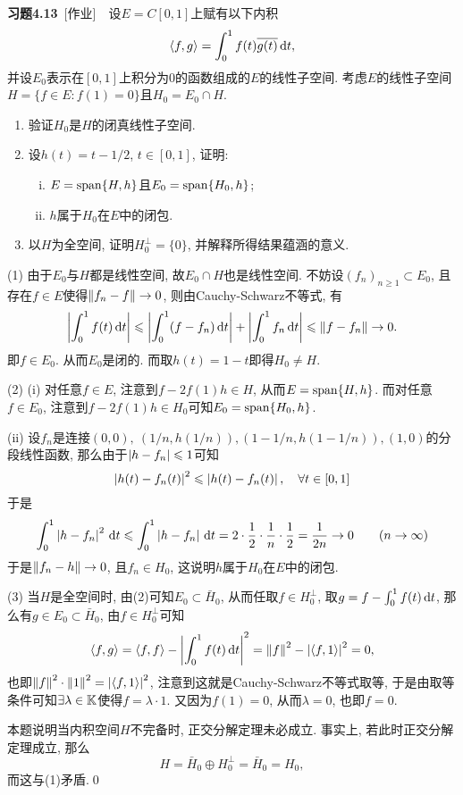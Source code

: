     \textbf{习题4.13}\ [作业]\ \ 设$ E=C[0,1] $上赋有以下内积
    \[
    \left\langle f,g \right\rangle=\int_0^1f(t)\overline{g(t)}\,\mathrm{d} t,
    \]
    并设$ E_0 $表示在$ [0,1] $上积分为0的函数组成的$ E $的线性子空间. 考虑$ E $的线性子空间$ H=\{ f\in E : f(1)=0 \} $且$ H_0=E_0\cap H $.
    \begin{enumerate}[(1)]
    \item 验证$ H_0 $是$ H $的闭真线性子空间.
    \item 设$ h(t)=t-1/2 $, $ t\in[0,1] $, 证明:
    \begin{enumerate}[(i)]
    \item $ E=\operatorname{span}\{H,h\} $且$ E_0=\operatorname{span}\{H_0,h\} $;
    \item $ h $属于$ H_0 $在$ E $中的闭包.
    \end{enumerate}
    \item 以$ H $为全空间, 证明$ H_0^\bot=\{0\} $, 并解释所得结果蕴涵的意义.
    \end{enumerate}
    \begin{Proof}
    (1) 由于$ E_0 $与$ H $都是线性空间, 故$ E_0\cap H $也是线性空间. 不妨设$ (f_n)_{n\geqslant 1}\subset E_0 $, 且存在$ f\in E $使得$ \left\| f_n-f \right\|\to 0 $, 则由Cauchy-Schwarz不等式, 有
    \[
    \left| \int_0^1f(t)\,\mathrm{d} t \right| \leqslant\left| \int_0^1(f-f_n)\,\mathrm{d} t \right| +\left| \int_0^1f_n\,\mathrm{d} t \right| \leqslant\left\| f-f_n \right\|\to 0.
    \]
    即$ f\in E_0 $. 从而$ E_0 $是闭的. 而取$ h(t)=1-t $即得$ H_0\ne H $.

    (2) (i) 对任意$ f\in E $, 注意到$ f-2f(1)h\in H $, 从而$ E=\operatorname{span}\{ H,h \} $. 而对任意$ f\in E_0 $, 注意到$ f-2f(1)h\in H_0 $可知$ E_0=\operatorname{span}\{ H_0,h \} $.

    (ii) 设$ f_n $是连接$ (0,0),\ (1/n,h(1/n)), (1-1/n,h(1-1/n)), (1,0) $的分段线性函数, 那么由于$ \left| h-f_n \right| \leqslant 1 $可知
    \[
    \left| h(t)-f_n(t) \right| ^2\leqslant\left| h(t)-f_n(t) \right| ,\quad\forall t\in [0,1]
    \]
    于是
    \[
    \int_0^1\left| h-f_n \right| ^2\,\mathrm{d} t\leqslant\int_0^1\left| h-f_n \right| \,\mathrm{d} t=2\cdot\frac{1}{2}\cdot\frac{1}{n}\cdot\frac{1}{2}=\frac{1}{2n}\to 0\qquad (n\to\infty)
    \]
    于是$ \left\| f_n-h \right\|\to 0 $, 且$ f_n\in H_0 $, 这说明$ h $属于$ H_0 $在$ E $中的闭包.

    (3) 当$ H $是全空间时, 由(2)可知$ E_0\subset\bar{H}_0 $, 从而任取$ f\in H_0^\bot $, 取$ g=f-\int_0^1f(t)\,\mathrm{d} t $, 那么有$ g\in E_0\subset \bar{H}_0 $, 由$ f\in H_0^\bot $可知
    \[
    \left\langle f,g \right\rangle=\left\langle f,f \right\rangle-\left| \int_0^1f(t)\,\mathrm{d} t \right| ^2=\left\| f \right\|^2-\left| \left\langle f,1 \right\rangle \right| ^2=0,
    \]
    也即$ \left\| f \right\|^2\cdot\left\| 1 \right\|^2=\left| \left\langle f,1 \right\rangle \right| ^2 $, 注意到这就是Cauchy-Schwarz不等式取等, 于是由取等条件可知$ \exists\lambda\in\mathbb{K} $使得$ f=\lambda\cdot 1 $. 又因为$ f(1)=0 $, 从而$ \lambda=0 $, 也即$ f=0 $.

    本题说明当内积空间$ H $不完备时, 正交分解定理未必成立. 事实上, 若此时正交分解定理成立, 那么
    \[
    H=\bar{H}_0\oplus H_0^\bot=\bar{H}_0=H_0,
    \]
    而这与(1)矛盾.\qed
    \end{Proof}

